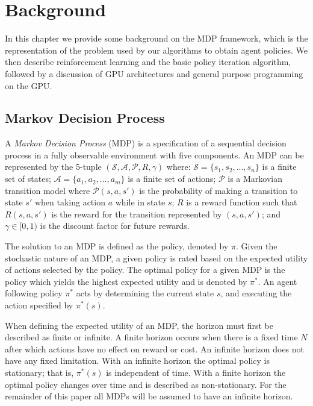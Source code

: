 \chapter{Background}

In this chapter we provide some background on the MDP framework, which is the representation of the problem used by our algorithms to obtain agent policies. We then describe reinforcement learning and the basic policy iteration algorithm, followed by a discussion of GPU architectures and general purpose programming on the GPU.

\section{Markov Decision Process}

A \emph{Markov Decision Process} (MDP) \cite{norvig} is a specification of a sequential decision process in a fully observable environment with five components. An MDP can be represented by the 5-tuple $(\mathcal{S, A, P}, R, \gamma)$ where: $\mathcal{S} = \{s_1, s_2, ..., s_n\}$ is a finite set of states; $\mathcal{A} = \{a_1, a_2, ..., a_m\}$ is a finite set of actions; $\mathcal{P}$ is a Markovian transition model where $\mathcal{P}(s, a, s')$ is the probability of making a transition to state $s'$ when taking action $a$ while in state $s$; $R$ is a reward function such that $R(s, a, s')$ is the reward for the transition represented by $(s, a, s')$; and $\gamma \in [0, 1)$ is the discount factor for future rewards.

The solution to an MDP is defined as the policy, denoted by $\pi$. Given the stochastic nature of an MDP, a given policy is rated based on the expected utility of actions selected by the policy. The optimal policy for a given MDP is the policy which yields the highest expected utility and is denoted by $\pi^*$. An agent following policy $\pi^*$ acts by determining the current state $s$, and executing the action specified by $\pi^*(s)$.

When defining the expected utility of an MDP, the horizon must first be described as finite or infinite. A finite horizon occurs when there is a fixed time $N$ after which actions have no effect on reward or cost. An infinite horizon does not have any fixed limitation. With an infinite horizon the optimal policy is stationary; that is, $\pi^*(s)$ is independent of time. With a finite horizon the optimal policy changes over time and is described as non-stationary. For the remainder of this paper all MDPs will be assumed to have an infinite horizon.

